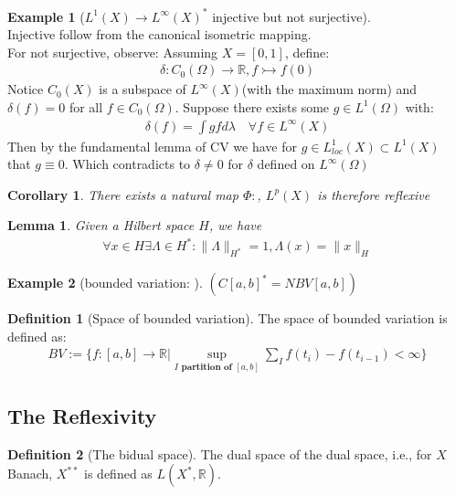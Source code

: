 \documentclass[a4paper,11pt,fleqn]{book}
\newtheorem{corollary}{Corollary}[theorem]
\newtheorem{lemma}[theorem]{Lemma}
\theoremstyle{definition}
\newtheorem{definition}{Definition}[section]
\newtheorem*{example}{Example}
\theoremstyle{remark}
\begin{document}
\begin{example}[$L^1(X) \rightarrow L^\infty(X)^*$ injective but not surjective]\quad\\
Injective follow from the canonical isometric mapping.\\
For not surjective, observe:
Assuming $ X = [0, 1]$, define:
\begin{align*}
	\delta: C_0(\Omega) \rightarrow \mathbb{R}, f \rightarrowtail f(0)
\end{align*}	
Notice $C_0(X)$ is a subspace of $L^\infty(X)$(with the maximum norm) and $\delta(f) = 0$ for all $f \in C_0(\Omega)$. Suppose there exists some $g \in L^1(\Omega)$ with:
\begin{align*}
	\delta(f) = \int gf d\lambda \quad \forall f \in L^\infty(X)
\end{align*}
Then by the fundamental lemma of CV we have for $g \in L^1_{loc}(X) \subset L^1(X)$ that $g \equiv 0$. Which contradicts to $\delta \neq 0$ for $\delta$ defined on $L^\infty(\Omega)$
\end{example}


\begin{corollary}
	There exists a natural map $\Phi:$, $L^p(X)$ is therefore reflexive
\end{corollary}

\begin{lemma}
	Given a Hilbert space $H$, we have
	\begin{align*}
		\forall x \in H \exists \Lambda \in H^*: \|\Lambda\|_{H^*} = 1, \Lambda(x) = \|x\|_H
	\end{align*}
\end{lemma}


\begin{example}[bounded variation: ]$(C[a,b]^* = NBV[a, b])$
	
\end{example}

\begin{definition}[Space of bounded variation]
	The space of bounded variation is defined as:
	\begin{align*}
		BV:=\bigg \{ f:[a, b]\rightarrow \mathbb{R}\bigg| \sup_{I \textbf{ partition of }[a, b]} \sum_{I} f(t_i) - f(t_{i-1}) < \infty \bigg\}
	\end{align*}
\end{definition}

\subsection{The Reflexivity}
\begin{definition}[The bidual space]
The dual space of the dual space, i.e., for $X$ Banach, $X^{**}$ is defined as $L(X^*, \mathbb{R})$. 
\end{definition}
\end{document}
